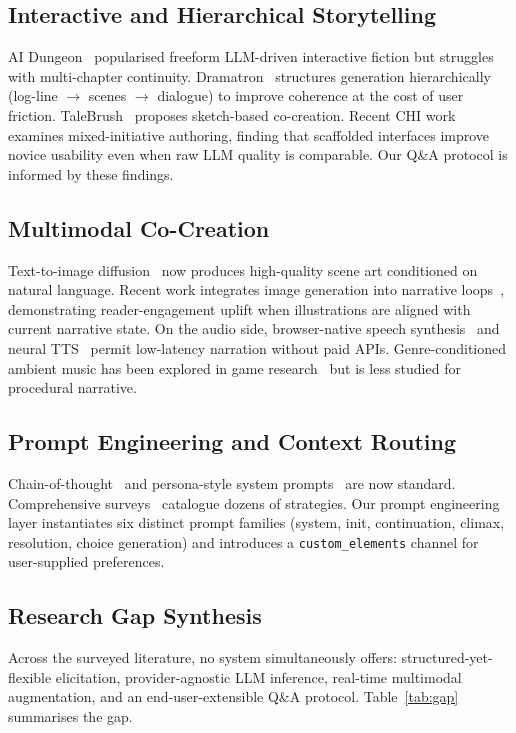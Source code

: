 \documentclass[conference,10pt,a4paper]{IEEEtran}
\begin{document}
\subsection{Interactive and Hierarchical Storytelling}
AI Dungeon~\cite{walton2019aidungeon} popularised freeform LLM-driven
interactive fiction but struggles with multi-chapter continuity.
Dramatron~\cite{mirowski2023dramatron} structures generation
hierarchically (log-line $\rightarrow$ scenes $\rightarrow$ dialogue)
to improve coherence at the cost of user friction.
TaleBrush~\cite{chung2022talebrush} proposes sketch-based
co-creation. Recent CHI work~\cite{liu2023endusers,yuan2022wordcraft}
examines mixed-initiative authoring, finding that scaffolded
interfaces improve novice usability even when raw LLM quality is
comparable. Our Q\&A protocol is informed by these findings.

\subsection{Multimodal Co-Creation}
Text-to-image diffusion~\cite{ramesh2022unclip,podell2024sdxl,bfl2024flux}
now produces high-quality scene art conditioned on natural language.
Recent work integrates image generation into narrative
loops~\cite{schuhmann2024visualstory,bouhuis2024crossmodal},
demonstrating reader-engagement uplift when illustrations are aligned
with current narrative state. On the audio side, browser-native speech
synthesis~\cite{w3c2024webspeech} and neural
TTS~\cite{casanova2024xtts} permit low-latency narration without paid
APIs. Genre-conditioned ambient music has been explored in game
research~\cite{lopezrincon2024music} but is less studied for procedural
narrative.

\subsection{Prompt Engineering and Context Routing}
Chain-of-thought~\cite{wei2022cot} and persona-style system
prompts~\cite{reynolds2021promptprog} are now standard. Comprehensive
surveys~\cite{liu2023promptsurvey,sahoo2024promptsurvey} catalogue
dozens of strategies. Our prompt engineering layer instantiates six
distinct prompt families (system, init, continuation, climax,
resolution, choice generation) and introduces a
\texttt{custom\_elements} channel for user-supplied preferences.

\subsection{Research Gap Synthesis}
Across the surveyed literature, no system simultaneously offers:
structured-yet-flexible elicitation, provider-agnostic LLM inference,
real-time multimodal augmentation, and an end-user-extensible Q\&A
protocol. Table~\ref{tab:gap} summarises the gap.
\end{document}
